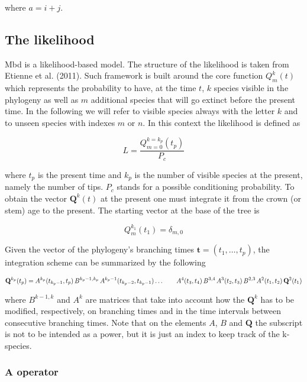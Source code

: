 \documentclass[]{article}
\begin{document}
where \(a = i + j\).

\hypertarget{the-likelihood}{%
\subsection{The likelihood}\label{the-likelihood}}

Mbd is a likelihood-based model. The structure of the likelihood is taken from
Etienne et al. (2011). Such framework is built around the core function
\(Q_{m}^{k}(t)\) which represents the probability to have, at the time \(t\), \(k\)
species visible in the phylogeny as well as \(m\) additional species that will
go extinct before the present time. In the following we will refer to visible
species always with the letter \(k\) and to unseen species with indexes \(m\)
or \(n\).
In this context the likelihood is defined as

\[
L = \frac{Q_{m = 0}^{k = k_{p}}(t_{p})}{P_c}
\]

where \(t_p\) is the present time and \(k_p\) is the number of visible species at
the present, namely the number of tips. \(P_c\) stands for a possible conditioning
probability.
To obtain the vector \(\mathbf{Q}^k(t)\) at the present one must integrate it from
the crown (or stem) age to the present. The starting vector at the base of the
tree is

\[
Q_{m}^{k_{1}}(t_{1}) = \delta_{m,0}
\]

Given the vector of the phylogeny's branching times
\(\mathbf{t} = (t_1, \dots, t_p)\), the integration scheme can be
summarized by the following

\[
 \mathbf{Q}^{k_p}(t_p) = A^{k_p}(t_{k_p-1},t_p)\, B^{k_p-1,k_p}\,
    A^{k_p-1}(t_{k_p-2},t_{k_p-1}) \ldots \notag \\
 \qquad A^{4}(t_3,t_4)\,B^{3,4}\,A^{3}(t_2,t_3)\,
    B^{2,3}\, A^{2}(t_1,t_2)\, \mathbf{Q}^2(t_1)
\]

where \(B^{k - 1, k}\) and \(A^k\) are matrices that take into account how
the \(\mathbf{Q}^k\) has to be modified, respectively, on branching times and in
the time intervals between consecutive branching times. Note that on the
elements \(A\), \(B\) and \(\mathbf{Q}\) the subscript is not to be intended as a
power, but it is just an index to keep track of the k-species.

\hypertarget{a-operator}{%
\subsubsection{A operator}\label{a-operator}}
\end{document}

